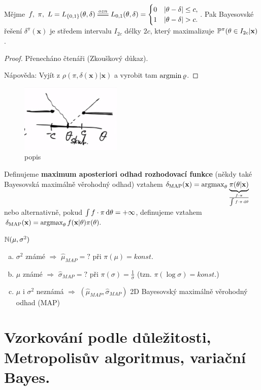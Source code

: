\begin{theorem}
	Mějme $f,~\pi,~L=L_{\{0,1\}}(\t,\delta)\equal{ozn}L_{0,1}(\t,\delta)=\begin{cases}
	0&|\t-\delta|\leq c,\\1& |\t-\delta|>c.
	\end{cases}$. Pak Bayesovské řešení $\delta^\pi(\textbf{x})$ je středem intervalu $I_{2c}$ délky $2c$, který maximalizuje $\mathbb{P}^\pi(\theta\in I_{2c}|\textbf{x})$.
	\begin{proof}
		Přenecháno čtenáři (Zkouškový důkaz).
		
		Nápověda: Vyjít z $\rho(\pi,\delta(\textbf{x})|\textbf{x})$ a vyrobit tam $\mathop{\mathrm{argmin}} \varrho$.
	\end{proof}
\begin{figure}[h]
	\centering
	\includegraphics[width=0.7\linewidth]{pictures/10.12-2}
	\caption{popis}
	\label{fig:105}
\end{figure}
\end{theorem}
\FloatBarrier

\begin{define}
	Definujeme \textbf{maximum aposteriori odhad rozhodovací funkce} (někdy také Bayesovská maximálně věrohodný odhad) vztahem $\delta_\mathrm{MAP}(\textbf{x})=\mathop{\mathrm{argmax}}_\theta \underbrace{\pi(\theta|\textbf{x})}_{\frac{f\cdot\pi}{\int f\cdot\pi\,\mathrm{d}\theta}}$ nebo alternativně, pokud $\int f\cdot\pi\,\mathrm{d}\theta=+\infty$, definujeme vztahem  $\delta_\mathrm{MAP}(\textbf{x})=\mathop{\mathrm{argmax}}_\theta f(\textbf{x}|\theta)\pi(\theta).$
\end{define}

\begin{example}
$\mathbb{N}(\mu,\sigma^2)$
\begin{enumerate}[a)]
\item $\sigma^2$ známé $\Rightarrow$ $\widehat{\mu}_{MAP}=?$ při $\pi(\mu)=konst.$
\item $\mu$ známé $\Rightarrow$ $\widehat{\sigma}_{MAP}=?$ při $\pi(\sigma)=\frac{1}{\sigma}$ (tzn. $\pi(\log \sigma)=konst.$)
\item $\mu$ i $\sigma^2$ neznámá $\Rightarrow$ $(\widehat{\mu}_{MAP},\widehat{\sigma}_{MAP})$ 2D Bayesovský maximálně věrohodný odhad (MAP)
\end{enumerate}
\end{example}

\chapter{Vzorkování podle důležitosti, Metropolisův algoritmus, variační Bayes.}




